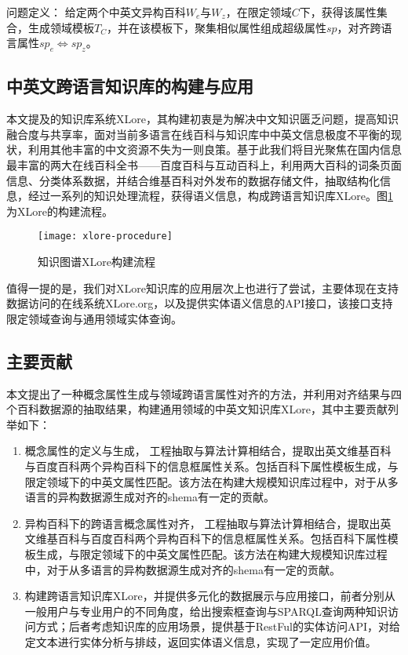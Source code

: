 {\heiti 问题定义：} 给定两个中英文异构百科$W_{e}$与$W_{z}$，在限定领域$C$下，获得该属性集合，生成领域模板${T_{C}}$，并在该模板下，聚集相似属性组成超级属性$sp$，对齐跨语言属性$sp_{e} \Leftrightarrow sp_{z}$。

\subsection{中英文跨语言知识库的构建与应用}
本文提及的知识库系统XLore，其构建初衷是为解决中文知识匮乏问题，提高知识融合度与共享率，面对当前多语言在线百科与知识库中中英文信息极度不平衡的现状，利用其他丰富的中文资源不失为一则良策。基于此我们将目光聚焦在国内信息最丰富的两大在线百科全书——百度百科与互动百科上，利用两大百科的词条页面信息、分类体系数据，并结合维基百科对外发布的数据存储文件，抽取结构化信息，经过一系列的知识处理流程，获得语义信息，构成跨语言知识库XLore。图\ref{fig:xlore-procedure}为XLore的构建流程。

\begin{figure}[H]
  \centering
  \texttt{[image: xlore-procedure]}
  \caption{知识图谱XLore构建流程}
  \label{fig:xlore-procedure}
\end{figure}

值得一提的是，我们对XLore知识库的应用层次上也进行了尝试，主要体现在支持数据访问的在线系统XLore.org，以及提供实体语义信息的API接口，该接口支持限定领域查询与通用领域实体查询。

\subsection{主要贡献}
本文提出了一种概念属性生成与领域跨语言属性对齐的方法，并利用对齐结果与四个百科数据源的抽取结果，构建通用领域的中英文知识库XLore，其中主要贡献列举如下：
\begin{enumerate}[1)]
\item {\heiti 概念属性的定义与生成，} 工程抽取与算法计算相结合，提取出英文维基百科与百度百科两个异构百科下的信息框属性关系。包括百科下属性模板生成，与限定领域下的中英文属性匹配。该方法在构建大规模知识库过程中，对于从多语言的异构数据源生成对齐的shema有一定的贡献。
\item {\heiti 异构百科下的跨语言概念属性对齐，} 工程抽取与算法计算相结合，提取出英文维基百科与百度百科两个异构百科下的信息框属性关系。包括百科下属性模板生成，与限定领域下的中英文属性匹配。该方法在构建大规模知识库过程中，对于从多语言的异构数据源生成对齐的shema有一定的贡献。
\item {\heiti 构建跨语言知识库XLore，并提供多元化的数据展示与应用接口，}前者分别从一般用户与专业用户的不同角度，给出搜索框查询与SPARQL查询两种知识访问方式；后者考虑知识库的应用场景，提供基于RestFul的实体访问API，对给定文本进行实体分析与排歧，返回实体语义信息，实现了一定应用价值。
\end{enumerate}

